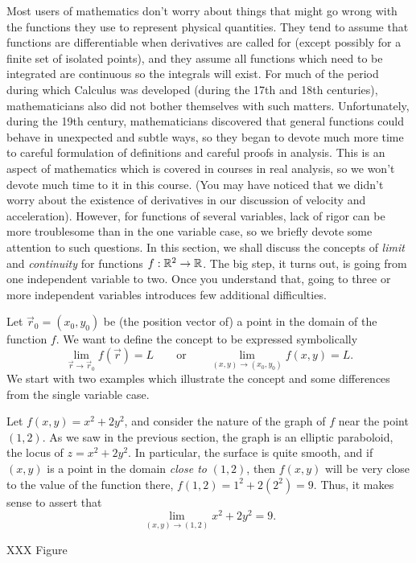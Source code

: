 Most users of mathematics don't worry about things that might
go wrong with the functions they use to represent physical quantities.
They tend to assume that  functions  are differentiable when derivatives
are called for  (except possibly for a finite set of isolated points),
and they assume all functions which need to be integrated are continuous
so the integrals will exist.   For much of the period during which
Calculus was developed (during the 17th and 18th centuries), mathematicians
also did not bother themselves with such matters.   Unfortunately,
during the 19th century, mathematicians discovered that general
functions could behave in  unexpected and subtle ways, so they began to 
devote much more time to careful formulation of definitions and careful
proofs in analysis.   This is an aspect of mathematics which is
covered in courses in real analysis, so we won't devote much time
to it in this course.  (You may have noticed that we didn't worry
about the existence of derivatives in our discussion of
velocity and acceleration).  However, 
for functions of several variables,
lack of rigor can be more troublesome than in
the one variable case,  so we briefly devote some attention to such
questions.
 In this section, we shall discuss the concepts
of \emph{limit} and \emph{continuity} for functions $f:\mathbb{R}^2 \to \mathbb{R}$.
The big step, it turns out, is going from one independent 
variable to two.
Once you understand that, going to three or more
independent variables introduces
few additional difficulties.

Let  $\vec r_0 = ( x_0, y_0 )$ be (the position vector of) a point
in the domain of the function $f$.   We want to define the
concept to be expressed symbolically
\[
    \lim_{\vec r \to \vec r_0} f(\vec r) = L \qquad\text{or}\qquad 
   \lim_{(x,y)\to (x_0,y_0)} f(x,y) = L.
\]
We start with two examples which illustrate the concept and some
differences from the single variable case.

\begin{example}
	\label{EXCONTLIMIT}
	Let $f(x,y) = x^2 + 2y^2$, and consider the
	nature of the graph of $f$  near the point $(1,2)$.  As
	we saw in the previous section, the graph is an elliptic paraboloid,
	the locus of $z = x^2 + 2y^2$.
	In particular, the surface is quite smooth, and if $(x,y)$ is
	a point in the domain \emph{close to} $(1,2)$, then $f(x,y)$
	will be very close to the value of the function there, $f(1,2) =
	1^2 + 2(2^2) = 9$.   Thus, it makes sense to assert that
	\[
	 \lim_{(x,y)\to (1,2)} x^2 + 2y^2 = 9.
	\]

	XXX Figure
\end{example}

